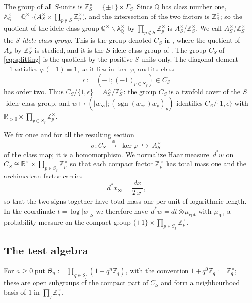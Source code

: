 \documentclass[11pt]{amsart}
\theoremstyle{definition}
\theoremstyle{remark}
\newcommand{\R}{\mathbb R}
\newcommand{\Z}{\mathbb Z}
\newcommand{\Q}{\mathbb Q}
\newcommand{\dstar}{\,d^{*}}
\newcommand{\sgn}{\operatorname{sgn}}
\begin{document}
The group of all $S$-units is $\Z_S^{\times}=\{\pm1\}\times\Gamma_S$.  Since
$\Q$ has class number one, $\mathbb A_{\Q}^{\times}=\Q^{\times}\cdot
\bigl(A_S^{\times}\times\prod_{p\notin S}\Z_p^{\times}\bigr)$, and the
intersection of the two factors is $\Z_S^{\times}$; so the quotient of the
idele class group $\Q^{\times}\backslash\mathbb A_{\Q}^{\times}$ by
$\prod_{p\notin S}\Z_p^{\times}$ is $A_S^{\times}/\Z_S^{\times}$.  We call
$A_S^{\times}/\Z_S^{\times}$ the \emph{$S$-idele class group}.
This is the group denoted $C_S$ in \cite[Section~VII]{Connes99}, where the
quotient of $A_S$ by $\Z_S^{\times}$ is studied, and it is the $S$-idele
class group of \cite[Section~3]{MeyerIdele}.
The group $C_S$ of \eqref{eq:splitting} is the quotient by the positive
$S$-units only.  The diagonal element $-1$ satisfies $\varphi(-1)=1$, so it
lies in $\ker\varphi$, and its class
\begin{equation}\label{eq:epsclass}
\epsilon:=(-1;(-1)_{p\in S_f})\in C_S
\end{equation}
has order two.  Thus $C_S/\{1,\epsilon\}=A_S^{\times}/\Z_S^{\times}$: the
group $C_S$ is a twofold cover of the $S$-idele class group, and
$w\mapsto(|w_{\infty}|;(\sgn(w_{\infty})w_p)_p)$ identifies
$C_S/\{1,\epsilon\}$ with $\R_{>0}\times\prod_{p\in S_f}\Z_p^{\times}$.

We fix once and for all the resulting section
\begin{equation}\label{eq:section}
\sigma: C_S\;\xrightarrow{\ \cong\ }\;\ker\varphi\;\hookrightarrow\;A_S^{\times}
\end{equation}
of the class map; it is a homomorphism.  We normalize Haar measure
$\dstar w$ on $C_S\cong\R^{\times}\times\prod_{p\in S_f}\Z_p^{\times}$ so that
each compact factor $\Z_p^{\times}$ has total mass one and the archimedean
factor carries
\begin{equation}\label{eq:archmeasure}
\dstar x_{\infty}=\frac{dx}{2|x|},
\end{equation}
so that the two signs together have total mass one per unit of logarithmic
length.  In the coordinate $t=\log|w|_S$ we therefore have
$\dstar w=dt\otimes\mu_{\mathrm{cpt}}$ with $\mu_{\mathrm{cpt}}$ a probability
measure on the compact group $\{\pm1\}\times\prod_{p\in S_f}\Z_p^{\times}$.

\subsection{The test algebra}

For $n\ge0$ put $\Theta_n:=\prod_{q\in S_f}(1+q^{n}\Z_q)$, with the convention
$1+q^{0}\Z_q:=\Z_q^{\times}$; these are open subgroups of the compact part of
$C_S$ and form a neighbourhood basis of $1$ in $\prod_q\Z_q^{\times}$.
\end{document}
